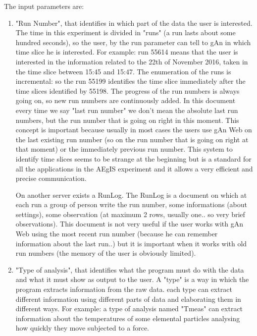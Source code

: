 The input parameters are:
\begin{enumerate}

\item "Run Number", that identifies in which part of the data the user is interested. 
The time in this experiment is divided in "runs" (a run lasts about some hundred seconds), so the user, by the run parameter can tell to gAn in which time slice he is interested. For example: run 55614 means that the user is interested in the information related to the 22th of November 2016, taken in the time slice between 15:45 and 15:47. 
The enumeration of the runs is incremental: so the run 55199 identifies the time slice immediately after the time slices identified by 55198. The progress of the run numbers is always going on, so new run numbers are continuously added. 
In this document every time we say "last run number" we don't mean the absolute last run numbers, but the run number that is going on right in this moment. This concept is important because usually in most cases the users use gAn Web on the last existing run number (so on the run number that is going on right at that moment) or the immediately previous run number.  
This system to identify time slices seems to be strange at the beginning but is a standard for all the applications in the AEgIS experiment and it allows a very efficient and precise communication.

On another server exists a RunLog. The RunLog is a document on which at each run  a group of person write the run number, some informations (about settings), some observation (at maximum 2 rows, usually one.. so very brief observations). This document is not very useful if the user works with gAn Web using the most recent run number (because he can remember information about the last run..) but it is important when it works with old run numbers (the memory of the user is obviously limited). 
 

\item "Type of analysis", that identifies what the program must do with the data and what it must show as output to the user.
A "type" is a way in which the program extracts information from the raw data. each type can extract different information using different parts of data and elaborating them in different ways. For example: a type of analysis named "Tmeas" can extract information about the temperatures of some elemental particles analysing how quickly they move subjected to a force. 

\end{enumerate}


